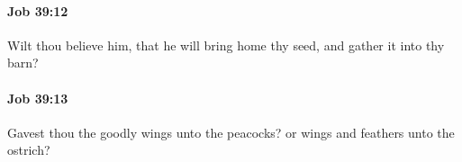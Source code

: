 		\paragraph{Job 39:12} %
			\label{JOB-39-12}

			Wilt thou believe him, that he will bring home thy seed, and gather it into thy barn?


		\paragraph{Job 39:13} %
			\label{JOB-39-13}

			Gavest thou the goodly wings unto the peacocks? or wings and feathers unto the ostrich?


